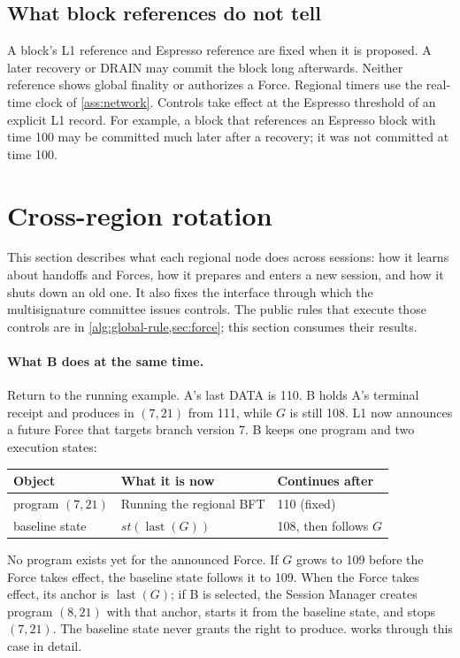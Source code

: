 \documentclass[11pt,a4paper]{article}
\newcounter{protocol}
\begin{document}
\subsection{What block references do not tell}
\label{sec:late-receipt}
A block's L1 reference and Espresso reference are fixed when it
is proposed. A later recovery or DRAIN may commit the block long
afterwards. Neither reference shows global finality or authorizes a
Force. Regional timers use the real-time clock of \cref{ass:network}.
Controls take effect at the Espresso threshold of an explicit L1 record.
For example, a block that references an Espresso block with time 100 may
be committed much later after a recovery; it was not committed at time
100.

\section{Cross-region rotation}
\label{sec:xprotocols}
This section describes what each regional node does across sessions:
how it learns about handoffs and Forces, how it prepares and enters a new
session, and how it shuts down an old one. It also fixes the interface
through which the multisignature committee issues controls. The public
rules that execute those controls are in \cref{alg:global-rule,sec:force};
this section consumes their results.

\paragraph{What B does at the same time.}
Return to the running example. A's last DATA is 110. B holds A's
terminal receipt and produces in $(7,21)$ from 111, while $G$ is still
108. L1 now announces a future Force that targets branch version 7. B
keeps one program and two execution states:
\begin{center}\small
\begin{tabular}{@{}lll@{}}\toprule
Object & What it is now & Continues after\\\midrule
program $(7,21)$ & Running the regional BFT & 110 (fixed)\\
baseline state & $\mathit{st}(\operatorname{last}(G))$ & 108, then follows $G$\\\bottomrule
\end{tabular}
\end{center}
No program exists yet for the announced Force. If $G$ grows to 109
before the Force takes effect, the baseline state follows it to 109.
When the Force takes effect, its anchor is $\operatorname{last}(G)$; if
B is selected, the Session Manager creates program $(8,21)$ with that
anchor, starts it from the baseline state, and stops $(7,21)$. The
baseline state never grants the right to produce.
 works through this case in detail.
\end{document}
